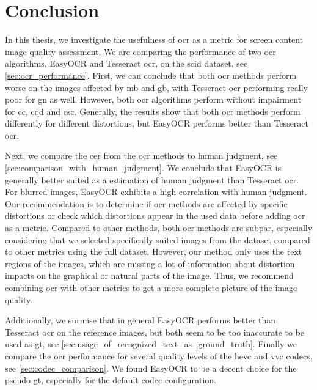 \chapter{Conclusion}
\label{chap:conclusion}

In this thesis, we investigate the usefulness of \gls{ocr} as a metric for screen content image quality assessment.
We are comparing the performance of two \gls{ocr} algorithms, EasyOCR and Tesseract \gls{ocr}, on the \gls{scid} dataset, see \autoref{sec:ocr_performance}.
First, we can conclude that both \gls{ocr} methods perform worse on the images affected by \gls{mb} and \gls{gb}, with Tesseract \gls{ocr} performing really poor for \gls{gn} as well.
However, both \gls{ocr} algorithms perform without impairment for \gls{cc}, \gls{cqd} and \gls{csc}.
Generally, the results show that both \gls{ocr} methods perform differently for different distortions, but EasyOCR performs better than Tesseract \gls{ocr}.


Next, we compare the \gls{cer} from the \gls{ocr} methods to human judgment, see \autoref{sec:comparison_with_human_judgment}.
We conclude that EasyOCR is generally better suited as a estimation of human judgment than Tesseract \gls{ocr}.
For blurred images, EasyOCR exhibits a high correlation with human judgment.
Our recommendation is to determine if \gls{ocr} methods are affected by specific distortions or check which distortions appear in the used data before adding \gls{ocr} as a metric.
Compared to other methods, both \gls{ocr} methods are subpar, especially considering that we selected specifically suited images from the dataset compared to other metrics using the full dataset.
However, our method only uses the text regions of the images, which are missing a lot of information about distortion impacts on the graphical or natural parts of the image.
Thus, we recommend combining \gls{ocr} with other metrics to get a more complete picture of the image quality.

Additionally, we surmise that in general EasyOCR performs better than Tesseract \gls{ocr} on the reference images, but both seem to be too inaccurate to be used as \gls{gt}, see \autoref{sec:usage_of_recognized_text_as_ground_truth}.
Finally we compare the \gls{ocr} performance for several quality levels of the \gls{hevc} and \gls{vvc} codecs, see \autoref{sec:codec_comparison}.
We found EasyOCR to be a decent choice for the pseudo \gls{gt}, especially for the default codec configuration.


